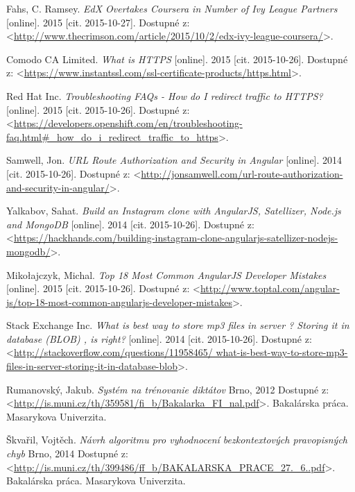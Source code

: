 \documentclass[12pt,oneside]{fithesis2}
\begin{document}
    \begin{thebibliography}{59}
    
  		Fahs, C. Ramsey.
  		\emph{EdX Overtakes Coursera in Number of Ivy League Partners}
  		[online].
  		2015
  		[cit. 2015-10-27].
  		Dostupné z: <\url{http://www.thecrimson.com/article/2015/10/2/edx-ivy-league-coursera/}>.

  		Comodo CA Limited.
  		\emph{What is HTTPS}
  		[online].
  		2015
  		[cit. 2015-10-26].
  		Dostupné z: <\url{https://www.instantssl.com/ssl-certificate-products/https.html}>.
	
  		Red Hat Inc.
  		\emph{Troubleshooting FAQs - How do I redirect traffic to HTTPS?}
  		[online].
  		2015
  		[cit. 2015-10-26].
  		Dostupné z: <\url{https://developers.openshift.com/en/troubleshooting-faq.html#_how_do_i_redirect_traffic_to_https}>.
  		
  		Samwell, Jon.
  		\emph{URL Route Authorization and Security in Angular}
  		[online].
  		2014
  		[cit. 2015-10-26].
  		Dostupné z: <\url{http://jonsamwell.com/url-route-authorization-and-security-in-angular/}>.
  		
  		Yalkabov, Sahat.
  		\emph{Build an Instagram clone with AngularJS, Satellizer, Node.js and MongoDB}
  		[online].
  		2014
  		[cit. 2015-10-26].
  		Dostupné z: <\url{https://hackhands.com/building-instagram-clone-angularjs-satellizer-nodejs-mongodb/}>.
  		
  		Mikołajczyk, Michal.
  		\emph{Top 18 Most Common AngularJS Developer Mistakes}
  		[online].
  		2015
  		[cit. 2015-10-26].
  		Dostupné z: <\url{http://www.toptal.com/angular-js/top-18-most-common-angularjs-developer-mistakes}>.
  			
  		Stack Exchange Inc.
  		\emph{What is best way to store mp3 files in server ? Storing it in database (BLOB) , is right?}
  		[online].
  		2014
  		[cit. 2015-10-26].
  		Dostupné z: <\url{http://stackoverflow.com/questions/11958465/
  		what-is-best-way-to-store-mp3-files-in-server-storing-it-in-database-blob}>.
  		
  		Rumanovský, Jakub.
  		\emph{Systém na trénovanie diktátov}
  		Brno, 
  		2012
  		Dostupné z: <\url{http://is.muni.cz/th/359581/fi_b/Bakalarka_FI_nal.pdf}>.
  		Bakalárska práca. Masarykova Univerzita.
  		
  		Škvařil, Vojtěch.
  		\emph{Návrh algoritmu pro vyhodnocení bezkontextových pravopisných chyb}
  		Brno, 
  		2014
  		Dostupné z: <\url{http://is.muni.cz/th/399486/ff_b/BAKALARSKA_PRACE_27._6..pdf}>.
  		Bakalárska práca. Masarykova Univerzita.
  		

\end{thebibliography}
\end{document}

